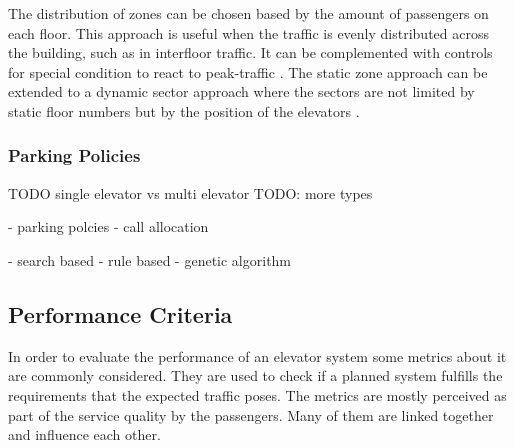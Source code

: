 The distribution of zones can be chosen based by the amount of passengers on each floor.
This approach is useful when the traffic is evenly distributed across the building, such as in interfloor traffic. It can be complemented with controls for special condition to react to peak-traffic \autocite[][p.~247]{barney2016handbook}.
The static zone approach can be extended to a dynamic sector approach where the sectors are not limited by static floor numbers but by the position of the elevators \autocite[][p.~250]{barney2016handbook}.


\subsubsection{Parking Policies}

TODO
single elevator  vs multi elevator
TODO: more types

\autocite[][pp.~3--4,10]{beers2015arrivals}
- parking polcies
- call allocation

\autocite[][pp.~3--6]{axelsson2013strategies}
- search based
- rule based
- genetic algorithm




\subsection{Performance Criteria}
\label{sota:sec:perf}

In order to evaluate the performance of an elevator system some metrics about it are commonly considered.
They are used to check if a planned system fulfills the requirements that the expected traffic poses. 
The metrics are mostly perceived as part of the service quality by the passengers.
Many of them are linked together and influence each other.


